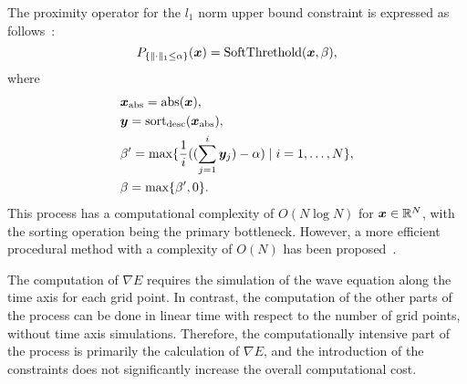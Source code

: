 The proximity operator for the $l_1$ norm upper bound constraint is expressed as follows~\cite{L1-ball-projection}:
\begin{equation} \label{eq:ProximityOperatorForL1Ball}  P_{ \{ \lVert  \cdot  \rVert _1 \le \alpha \} }(\bm{x}) = \text{SoftThrethold}(\bm{x}, \beta), \end{equation}
where
\begin{equation} \label{eq:ProximityOperatorForL1BallWhere} \begin{aligned} & \bm x_{\text{abs}} = \text{abs}(\bm{x}), \\ & \bm y = \text{sort}_{\text{desc}}(\bm{x}_{\text{abs}}), \\ & \beta' = \text{max} \{ \frac 1 i ((\sum_{j=1}^i \bm y_j) - \alpha) \mid i = 1, \ldots, N \}, \\ & \beta = \text{max} \{ \beta', 0 \}. \\ \end{aligned} \notag \end{equation}
This process has a computational complexity of $O(N\log{}N)$ for $\bm x \in \mathbb{R}^N$, with the sorting operation being the primary bottleneck.
However, a more efficient procedural method with a complexity of $O(N)$ has been proposed~\cite{fast-L1-ball-projection}.



The computation of $\nabla E$ requires the simulation of the wave equation along the time axis for each grid point.
In contrast, the computation of the other parts of the process can be done in linear time with respect to the number of grid points, without time axis simulations.
Therefore, the computationally intensive part of the process is primarily the calculation of $\nabla E$, and the introduction of the constraints does not significantly increase the overall computational cost.
